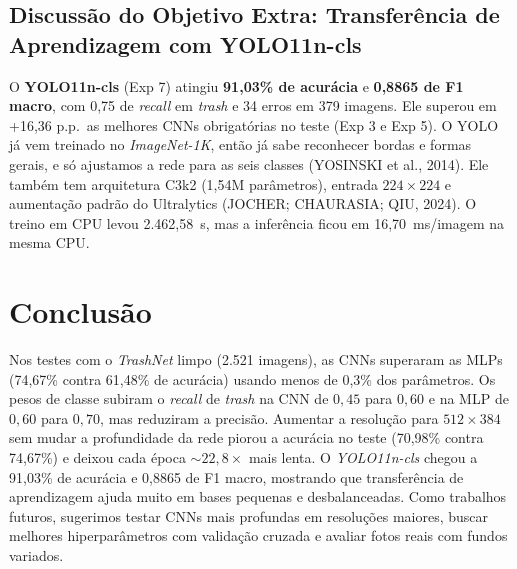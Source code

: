 \documentclass[11pt,a4paper]{article}
\begin{document}
\subsection{Discussão do Objetivo Extra: Transferência de Aprendizagem com YOLO11n-cls}

O \textbf{YOLO11n-cls} (Exp 7) atingiu \textbf{91,03\% de acurácia} e \textbf{0,8865 de F1 macro}, com 0,75 de \textit{recall} em \textit{trash} e 34 erros em 379 imagens. Ele superou em +16,36 p.p.\ as melhores CNNs obrigatórias no teste (Exp 3 e Exp 5). O YOLO já vem treinado no \textit{ImageNet-1K}, então já sabe reconhecer bordas e formas gerais, e só ajustamos a rede para as seis classes (YOSINSKI et al., 2014). Ele também tem arquitetura C3k2 (1,54M parâmetros), entrada $224 \times 224$ e aumentação padrão do Ultralytics (JOCHER; CHAURASIA; QIU, 2024). O treino em CPU levou 2.462,58~s, mas a inferência ficou em 16,70~ms/imagem na mesma CPU.

\section{Conclusão}

Nos testes com o \textit{TrashNet} limpo (2.521 imagens), as CNNs superaram as MLPs (74,67\% contra 61,48\% de acurácia) usando menos de 0,3\% dos parâmetros. Os pesos de classe subiram o \textit{recall} de \textit{trash} na CNN de $0{,}45$ para $0{,}60$ e na MLP de $0{,}60$ para $0{,}70$, mas reduziram a precisão. Aumentar a resolução para $512 \times 384$ sem mudar a profundidade da rede piorou a acurácia no teste (70,98\% contra 74,67\%) e deixou cada época ${\sim}22{,}8\times$ mais lenta. O \textit{YOLO11n-cls} chegou a 91,03\% de acurácia e 0,8865 de F1 macro, mostrando que transferência de aprendizagem ajuda muito em bases pequenas e desbalanceadas. Como trabalhos futuros, sugerimos testar CNNs mais profundas em resoluções maiores, buscar melhores hiperparâmetros com validação cruzada e avaliar fotos reais com fundos variados.

\end{document}
